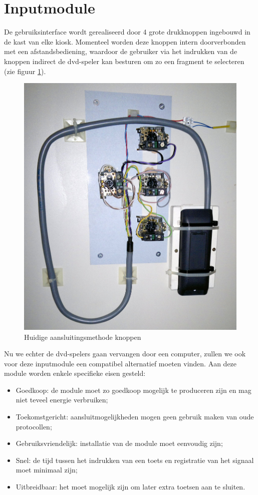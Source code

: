 \section{Inputmodule}
\label{ontwerp:hardware:input}

De gebruiksinterface wordt gerealiseerd door 4 grote drukknoppen ingebouwd in de kast van elke kiosk. Momenteel worden deze knoppen intern doorverbonden met een afstandsbediening, waardoor de gebruiker via het indrukken van de knoppen indirect de \acs{dvd}-speler kan besturen om zo een fragment te selecteren (zie figuur \ref{fig:hw:kiosk:knoppen}).

\begin{figure}
	\includegraphics[width=\textwidth]{afbeeldingen/kiosk_knoppen}
	\caption{Huidige aansluitingsmethode knoppen}
	\label{fig:hw:kiosk:knoppen}
\end{figure}

Nu we echter de \acs{dvd}-spelers gaan vervangen door een computer, zullen we ook voor deze inputmodule een compatibel alternatief moeten vinden. Aan deze module worden enkele specifieke eisen gesteld:
\begin{itemize}
\item Goedkoop: de module moet zo goedkoop mogelijk te produceren zijn en mag niet teveel energie verbruiken;
\item Toekomstgericht: aansluitmogelijkheden mogen geen gebruik maken van oude protocollen;
\item Gebruiksvriendelijk: installatie van de module moet eenvoudig zijn;
\item Snel: de tijd tussen het indrukken van een toets en registratie van het signaal moet minimaal zijn;
\item Uitbreidbaar: het moet mogelijk zijn om later extra toetsen aan te sluiten.
\end{itemize}

